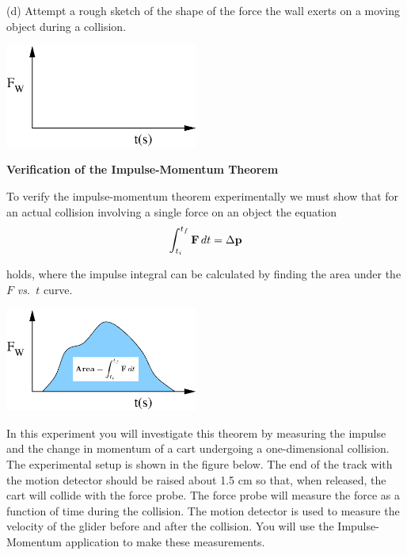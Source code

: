 (d) Attempt a rough sketch of the shape of the force the wall exerts on a moving
object during a collision.

\vspace{0.3cm}
{\par\centering \includegraphics[width=2.5in]{impulseFor132/fig2.eps} \par}
\vspace{0.3cm}

\textbf{Verification of the Impulse-Momentum Theorem} 

To verify the impulse-momentum theorem experimentally we must show that for
an actual collision involving a single force on an object the equation
\[
\int_{t_{i}}^{t_{f}}{\bf F}\,dt=\Delta {\bf p}\]


holds, where the impulse integral can be calculated by finding the area under
the  $F$ \textit{vs.}~$t$ curve.

\vspace{0.3cm}
{\par\centering \includegraphics[width=2.5in]{impulseFor132/fig3.eps} \par}
\vspace{0.3cm}

In this experiment you will investigate this theorem by measuring the impulse
and the change in momentum of a cart undergoing a one-dimensional collision.
The experimental setup is shown in the figure below. The end of the track with
the motion detector should be raised about 1.5 cm so that, when released, the
cart will collide with the force probe. The force probe will measure the force
as a function of time during the collision. The motion detector is used to measure
the velocity of the glider before and after the collision. You will use the
Impulse-Momentum application to make these measurements.


